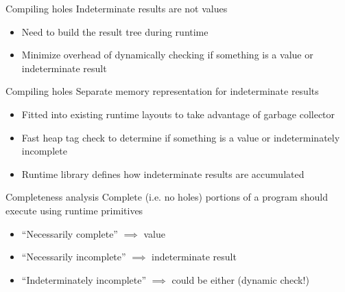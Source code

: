 \documentclass[aspectratio=169, xcolor={dvipsnames}, xtable]{beamer}
\begin{document}
\renewcommand{\currenttitle}{Compiling holes}
\begin{frame}{\currenttitle}
  Indeterminate results are not values
  \begin{itemize}
    \item Need to build the result tree during runtime
    \item Minimize overhead of dynamically checking if something is a value or indeterminate result
  \end{itemize}
\end{frame}

\renewcommand{\currenttitle}{Compiling holes}
\begin{frame}{\currenttitle}
  Separate memory representation for indeterminate results
  \begin{itemize}
    \item Fitted into existing runtime layouts to take advantage of garbage collector
    \item Fast heap tag check to determine if something is a value or indeterminately incomplete
    \item Runtime library defines how indeterminate results are accumulated
  \end{itemize}
\end{frame}

\renewcommand{\currenttitle}{Completeness analysis}
\begin{frame}{\currenttitle}
  Complete (i.e. no holes) portions of a program should execute using runtime primitives

  \begin{itemize}
    \item<+-> ``Necessarily complete'' $\implies$ value
    \item<+-> ``Necessarily incomplete'' $\implies$ indeterminate result
    \item<+-> ``Indeterminately incomplete'' $\implies$ could be either (dynamic check!)
  \end{itemize}

\end{frame}
\end{document}
